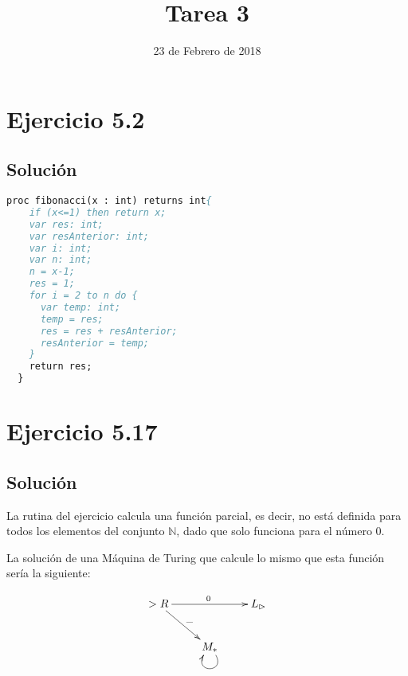 \documentclass[11pt, a4paper, titlepage]{article}
\begin{document}
\title{Tarea 3}
\date{23 de Febrero de 2018}
\maketitle
\newpage



\section*{Ejercicio 5.2}
\subsection*{Solución}
\begin{lstlisting}[language=pascal]
  proc fibonacci(x : int) returns int{
    if (x<=1) then return x;
    var res: int;
    var resAnterior: int;
    var i: int;
    var n: int;
    n = x-1;
    res = 1;
    for i = 2 to n do {
      var temp: int;
      temp = res;
      res = res + resAnterior;
      resAnterior = temp;
    }
    return res;
  }
\end{lstlisting}


\section*{Ejercicio 5.17}
\subsection*{Solución}
La rutina del ejercicio calcula una función parcial, es decir, no está definida para todos
los elementos del conjunto $\mathbb{N}$, dado que solo funciona para el número 0.

La solución de una Máquina de Turing que calcule lo mismo que esta función sería la siguiente:

\[
\xymatrix{
  >R \ar[rr]^{0} \ar[dr]^{\_} && L_\rhd \\
  & M_* \ar@(dr,dl)
}
\]
\end{document}
